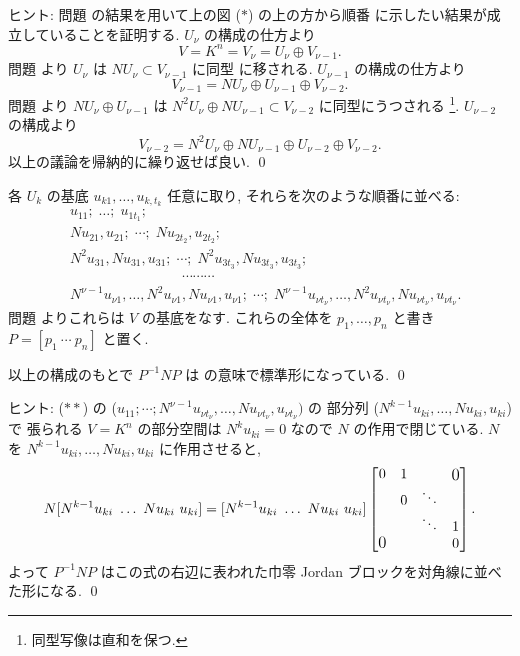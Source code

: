 \documentclass[12pt,twoside]{jarticle}
\begin{document}
\medskip
\noindent
ヒント: 問題  の結果を用いて上の図 ($\ast$) の上の方から順番
に示したい結果が成立していることを証明する.  $U_\nu$ の構成の仕方より
\begin{equation*}
  V=K^n=V_\nu=U_\nu\oplus V_{\nu-1}.
\end{equation*}
問題  より $U_\nu$ は $NU_\nu\subset V_{\nu-1}$ に同型
に移される.  $U_{\nu-1}$ の構成の仕方より
\begin{equation*}
  V_{\nu-1}=NU_\nu\oplus U_{\nu-1}\oplus V_{\nu-2}.
\end{equation*}
問題  より $NU_\nu\oplus U_{\nu-1}$ 
は $N^2U_\nu\oplus NU_{\nu-1}\subset V_{\nu-2}$ に同型にうつされる%
\footnote{同型写像は直和を保つ.}. 
$U_{\nu-2}$ の構成より
\begin{equation*}
  V_{\nu-2} = N^2U_\nu\oplus NU_{\nu-1}\oplus U_{\nu-2}\oplus V_{\nu-2}.
\end{equation*}
以上の議論を帰納的に繰り返せば良い.
\qed

\bigskip

各 $U_k$ の基底 $u_{k1},\dots,u_{k,t_k}$ 任意に取り,
それらを次のような順番に並べる:
\begin{align*}
  &
  u_{11};\;\dots;\; u_{1t_1};
  \\ &
  Nu_{21},u_{21};\;\cdots;\; Nu_{2t_2},u_{2t_2};
  \\ &
  N^2u_{31},Nu_{31},u_{31};\;\cdots;\; N^2u_{3t_3},Nu_{3t_3},u_{3t_3};
  \tag{$\ast\ast$}
  \\ &
  \qquad\qquad\qquad\qquad\cdots\cdots\cdots
  \\ &
  N^{\nu-1}u_{\nu1},\dots,N^2u_{\nu1},Nu_{\nu1},u_{\nu1};\;\cdots;\; 
  N^{\nu-1}u_{\nu t_\nu},\dots,N^2u_{\nu t_\nu},Nu_{\nu t_\nu},u_{\nu t_\nu}.
\end{align*}
問題  よりこれらは $V$ の基底をなす.  
これらの全体を $p_1,\dots,p_n$ と書き $P=[p_1\ \cdots\ p_n]$ と置く.

\begin{question}
\label{q:nilp-3}
  以上の構成のもとで $P^{-1}NP$ は
  の意味で標準形になっている.
  \qed
\end{question}

\noindent
ヒント: ($\ast\ast$) の ($u_{11};\cdots;
N^{\nu-1}u_{\nu t_\nu},\dots,Nu_{\nu t_\nu},u_{\nu t_\nu})$ の
部分列 ($N^{k-1}u_{ki},\dots,Nu_{ki},u_{ki}$) で
張られる $V=K^n$ の部分空間は $N^ku_{ki}=0$ なので $N$ の作用で閉じている.
$N$ を $N^{k-1}u_{ki},\dots,Nu_{ki},u_{ki}$ に作用させると,
\begin{equation*}
  N[N^{k-1}u_{ki}\ \dots\ Nu_{ki}\ u_{ki}]
  = [N^{k-1}u_{ki}\ \dots\ Nu_{ki}\ u_{ki}]
  \begin{bmatrix}
    0         & 1 &        & \bigzerou \\
              & 0 & \ddots & \\
              &   & \ddots & 1 \\
    \bigzerol &   &        & 0 \\
  \end{bmatrix}.
\end{equation*}
よって $P^{-1}NP$ はこの式の右辺に表われた巾零 Jordan ブロックを対角線に並べ
た形になる.
\qed
\end{document}
